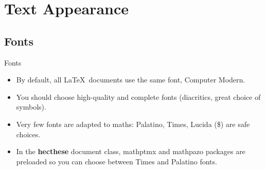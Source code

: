
\section{Text Appearance}

\subsection{Fonts}

\begin{frame}[c]{Fonts}
	\begin{itemize}
		\item By default, all \LaTeX\  documents use the same font, \textrm{Computer Modern}.
		\item You should choose high-quality and complete fonts (diacritics, great choice of symbols).
		\item Very few fonts are adapted to maths: Palatino, Times, Lucida (\$) are safe choices.
		\item In the \textbf{hecthese} document class, mathptmx and mathpazo packages are preloaded so you can choose between Times and Palatino fonts.
	\end{itemize}
\end{frame}

